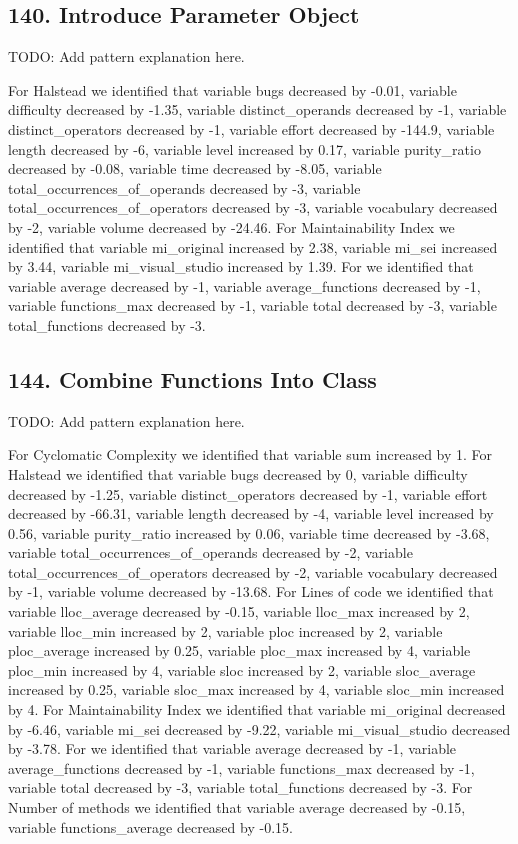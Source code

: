 \subsection{140. Introduce Parameter Object}

TODO: Add pattern explanation here.

For Halstead we identified that variable bugs decreased by -0.01, variable difficulty decreased by -1.35, variable distinct\_operands decreased by -1, variable distinct\_operators decreased by -1, variable effort decreased by -144.9, variable length decreased by -6, variable level increased by 0.17, variable purity\_ratio decreased by -0.08, variable time decreased by -8.05, variable total\_occurrences\_of\_operands decreased by -3, variable total\_occurrences\_of\_operators decreased by -3, variable vocabulary decreased by -2, variable volume decreased by -24.46.
For Maintainability Index we identified that variable mi\_original increased by 2.38, variable mi\_sei increased by 3.44, variable mi\_visual\_studio increased by 1.39.
For  we identified that variable average decreased by -1, variable average\_functions decreased by -1, variable functions\_max decreased by -1, variable total decreased by -3, variable total\_functions decreased by -3.

\subsection{144. Combine Functions Into Class}

TODO: Add pattern explanation here.

For Cyclomatic Complexity we identified that variable sum increased by 1.
For Halstead we identified that variable bugs decreased by 0, variable difficulty decreased by -1.25, variable distinct\_operators decreased by -1, variable effort decreased by -66.31, variable length decreased by -4, variable level increased by 0.56, variable purity\_ratio increased by 0.06, variable time decreased by -3.68, variable total\_occurrences\_of\_operands decreased by -2, variable total\_occurrences\_of\_operators decreased by -2, variable vocabulary decreased by -1, variable volume decreased by -13.68.
For Lines of code we identified that variable lloc\_average decreased by -0.15, variable lloc\_max increased by 2, variable lloc\_min increased by 2, variable ploc increased by 2, variable ploc\_average increased by 0.25, variable ploc\_max increased by 4, variable ploc\_min increased by 4, variable sloc increased by 2, variable sloc\_average increased by 0.25, variable sloc\_max increased by 4, variable sloc\_min increased by 4.
For Maintainability Index we identified that variable mi\_original decreased by -6.46, variable mi\_sei decreased by -9.22, variable mi\_visual\_studio decreased by -3.78.
For  we identified that variable average decreased by -1, variable average\_functions decreased by -1, variable functions\_max decreased by -1, variable total decreased by -3, variable total\_functions decreased by -3.
For Number of methods we identified that variable average decreased by -0.15, variable functions\_average decreased by -0.15.

